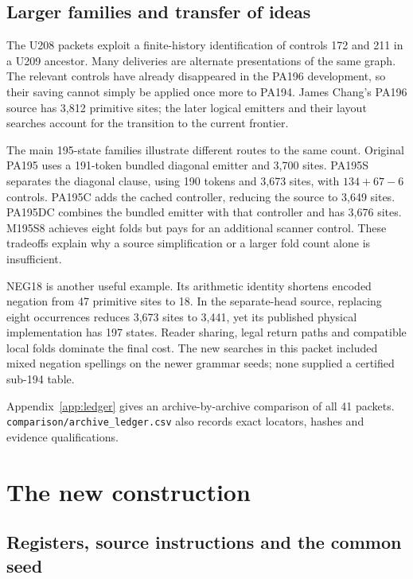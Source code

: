 \documentclass[11pt,letterpaper]{article}
\newcommand{\file}[1]{\texttt{\nolinkurl{#1}}}
\begin{document}
\subsection{Larger families and transfer of ideas}

The U208 packets exploit a finite-history identification of controls
172 and 211 in a U209 ancestor. Many deliveries are alternate
presentations of the same graph. The relevant controls have already
disappeared in the PA196 development, so their saving cannot simply be
applied once more to PA194. James Chang's PA196 source has 3,812 primitive
sites; the later logical emitters and their layout searches account for
the transition to the current frontier.

The main 195-state families illustrate different routes to the same
count. Original PA195 uses a 191-token bundled diagonal emitter and
3,700 sites. PA195S separates the diagonal clause, using 190 tokens and
3,673 sites, with \(134+67-6\) controls. PA195C adds the cached controller,
reducing the source to 3,649 sites. PA195DC combines the bundled emitter
with that controller and has 3,676 sites. M195S8 achieves eight folds but
pays for an additional scanner control. These tradeoffs explain why a
source simplification or a larger fold count alone is insufficient.

NEG18 is another useful example. Its arithmetic identity shortens
encoded negation from 47 primitive sites to 18. In the separate-head
source, replacing eight occurrences reduces 3,673 sites to 3,441,
yet its published physical implementation has
197 states. Reader sharing, legal return paths and compatible local
folds dominate the final cost. The new searches in this packet included
mixed negation spellings on the newer grammar seeds; none supplied a
certified sub-194 table.

Appendix~\ref{app:ledger} gives an archive-by-archive comparison of all
41 packets. \file{comparison/archive_ledger.csv} also records exact
locators, hashes and evidence qualifications.

\section{The new construction}
\label{sec:construction}

\subsection{Registers, source instructions and the common seed}
\end{document}
